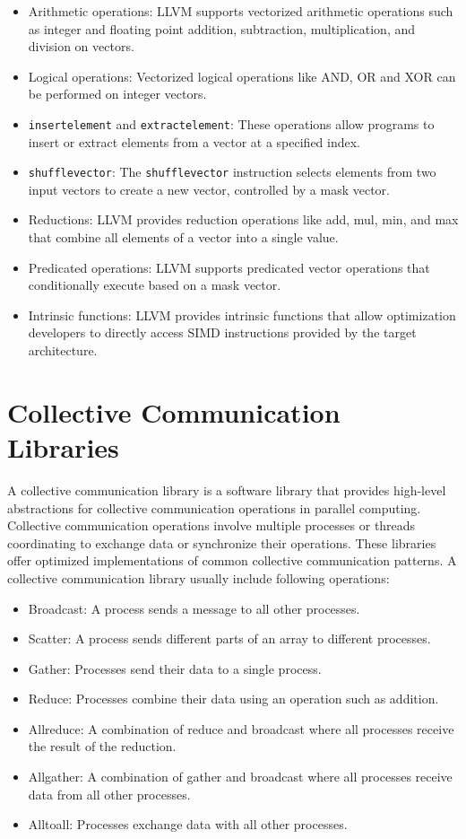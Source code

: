\begin{itemize}
  \item Arithmetic operations: LLVM supports vectorized arithmetic
  operations such as integer and floating point addition, subtraction,
  multiplication, and division on vectors.
  \item Logical operations: Vectorized logical operations like AND, OR
  and XOR can be performed on integer vectors.
  \item \texttt{insertelement} and \texttt{extractelement}: These
  operations allow programs to insert or extract elements from a
  vector at a specified index.
  \item \texttt{shufflevector}: The \texttt{shufflevector} instruction
  selects elements from two input vectors to create a new vector,
  controlled by a mask vector.
  \item Reductions: LLVM provides reduction operations like add, mul,
  min, and max that combine all elements of a vector into a single
  value.
  \item Predicated operations: LLVM supports predicated vector
  operations that conditionally execute based on a mask vector.
  \item Intrinsic functions: LLVM provides intrinsic functions that
  allow optimization developers to directly access SIMD instructions
  provided by the target architecture.
\end{itemize}


\section {Collective Communication Libraries}

A collective communication library is a software library that provides
high-level abstractions for collective communication operations in
parallel computing. Collective communication operations involve
multiple processes or threads coordinating to exchange data or
synchronize their operations. These libraries offer optimized
implementations of common collective communication patterns.
A collective communication library usually include following operations:

\begin{itemize}
    \item Broadcast: A process sends a message to all other processes.
    \item Scatter: A process sends different parts of an array to
    different processes.
    \item Gather: Processes send their data to a single process.
    \item Reduce: Processes combine their data using an operation such as
    addition.
    \item Allreduce: A combination of reduce and broadcast where all
    processes receive the result of the reduction.
    \item Allgather: A combination of gather and broadcast where all
    processes receive data from all other processes.
    \item Alltoall: Processes exchange data with all other processes.
\end{itemize}


